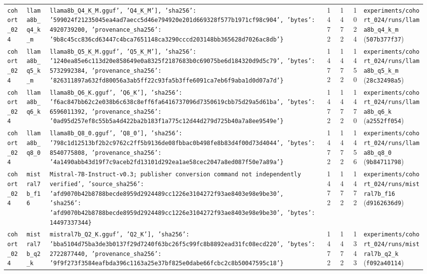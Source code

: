 {\begin{longtable}{@{}>{\raggedright\arraybackslash}p{1.5cm}>{\raggedright\arraybackslash}p{2.7cm}>{\raggedright\arraybackslash}p{3.2cm}rrr>{\raggedright\arraybackslash}p{4.2cm}@{}}
\texttt{cohort\_024} & \texttt{llama8b\_q4\_k\_m} & \texttt{llama8b\_Q4\_K\_M.gguf', 'Q4\_K\_M'], 'sha256': '599024f21235045ea4ad7aecc5d46e794920e201d669328f577b1971cf98c904', 'bytes': 4920739200, 'provenance\_sha256': '9b8c45cc836cd63447c4bca7651148ca3290cccd203148bb365628d7026ac8db'\}} & 1472 & 1472 & 1024 & \texttt{experiments/\allowbreak{}cohort\_024/\allowbreak{}runs/\allowbreak{}llama8b\_q4\_k\_m} (\texttt{507b377f37}) \\
\texttt{cohort\_024} & \texttt{llama8b\_q5\_k\_m} & \texttt{llama8b\_Q5\_K\_M.gguf', 'Q5\_K\_M'], 'sha256': '1240ea85e6c113d20e858649e0a8325f2187683b0c69075be6d184320d9d5c79', 'bytes': 5732992384, 'provenance\_sha256': '826311897a632fd80056a3ab5ff22c93fa5b3ffe6091ca7eb6f9aba1d0d07a7d'\}} & 1472 & 1472 & 1450 & \texttt{experiments/\allowbreak{}cohort\_024/\allowbreak{}runs/\allowbreak{}llama8b\_q5\_k\_m} (\texttt{28c32498a5}) \\
\texttt{cohort\_024} & \texttt{llama8b\_q6\_k} & \texttt{llama8b\_Q6\_K.gguf', 'Q6\_K'], 'sha256': 'f6ac847bb62c2e038b6c638c8eff6fa6416737096d7350619cbb75d29a5d61ba', 'bytes': 6596011392, 'provenance\_sha256': '0ad95d257ef8c55b5a4d422ba2b183f1a775c12d44d279d725b40a7a8ee9549e'\}} & 1472 & 1472 & 1470 & \texttt{experiments/\allowbreak{}cohort\_024/\allowbreak{}runs/\allowbreak{}llama8b\_q6\_k} (\texttt{a2552ff054}) \\
\texttt{cohort\_024} & \texttt{llama8b\_q8\_0} & \texttt{llama8b\_Q8\_0.gguf', 'Q8\_0'], 'sha256': '798c1d12513bf2b2c9762c2ff5b9136de08fbbac0b498fe8b83d4f00d73d4044', 'bytes': 8540775808, 'provenance\_sha256': '4a1490abb43d19f7c9aceb2fd13101d292ea1ae58cec2047a8ed087f50e7a89a'\}} & 1472 & 1472 & 1456 & \texttt{experiments/\allowbreak{}cohort\_024/\allowbreak{}runs/\allowbreak{}llama8b\_q8\_0} (\texttt{9b84711798}) \\
\texttt{cohort\_024} & \texttt{mistral7b\_f16} & \texttt{Mistral-\allowbreak{}7B-\allowbreak{}Instruct-\allowbreak{}v0.3; publisher conversion command not independently verified', 'source\_sha256': 'afd9070b42b8788becde8959d2924489cc1226e3104272f93ae8403e98e9be30', 'sha256': 'afd9070b42b8788becde8959d2924489cc1226e3104272f93ae8403e98e9be30', 'bytes': 14497337344\}} & 1472 & 1472 & 1472 & \texttt{experiments/\allowbreak{}cohort\_024/\allowbreak{}runs/\allowbreak{}mistral7b\_f16} (\texttt{d9162636d9}) \\
\texttt{cohort\_024} & \texttt{mistral7b\_q2\_k} & \texttt{mistral7b\_Q2\_K.gguf', 'Q2\_K'], 'sha256': 'bba5104d75ba3de3b0137f29d7240f63bc26f5c99fc8b8892ead31fc08ecd220', 'bytes': 2722877440, 'provenance\_sha256': '9f9f273f3584eafbda396c1163a25e37bf825e0dabe66fcbc2c8b50047595c18'\}} & 1472 & 1472 & 1343 & \texttt{experiments/\allowbreak{}cohort\_024/\allowbreak{}runs/\allowbreak{}mistral7b\_q2\_k} (\texttt{f092a40114}) \\

\end{longtable}}
